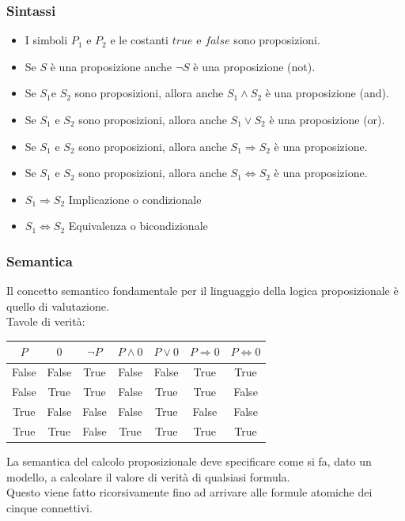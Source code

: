 \documentclass[../main.tex]{subfiles}
\begin{document}
	\subsubsection{Sintassi}
	\begin{itemize}
		\item I simboli $P_1$ e $P_2$ e le costanti $true$ e $false$ sono proposizioni.
		\item Se $S$ è una proposizione anche $\neg S$ è una proposizione (not).
		\item Se $S_1$e $S_2$ sono proposizioni, allora anche $S_1 \wedge S_2$ è una proposizione (and).
		\item Se $S_1$ e $S_2$ sono proposizioni, allora anche $S_1 \vee S_2$ è una proposizione (or).
		\item Se $S_1$ e $S_2$ sono proposizioni, allora anche $S_1 \Rightarrow S_2$ è una proposizione.
		\item Se $S_1$ e $S_2$ sono proposizioni, allora anche $S_1 \Leftrightarrow S_2$ è una proposizione.
		\item $S_1 \Rightarrow S_2$ Implicazione o condizionale
		\item $S_1 \Leftrightarrow S_2$ Equivalenza o bicondizionale
	\end{itemize}
	\subsubsection{Semantica}
	Il concetto semantico fondamentale per il linguaggio della logica proposizionale è quello di valutazione.\\
	Tavole di verità:
	\begin{center}
		\begin{tabular}{ |c|c|c|c|c|c|c| }
			\hline
			$P$ & $0$ & $\neg P$ & $P \wedge 0$ & $P \vee 0$ & $P \Rightarrow 0$ & $P \Leftrightarrow 0$\\
			\hline
			False & False & True & False & False & True & True\\
			\hline
			False & True & True & False & True & True & False\\
			\hline
			True & False & False & False & True & False & False\\
			\hline
			True & True & False & True & True & True & True \\
			\hline
		\end{tabular}
	\end{center}
	La semantica del calcolo proposizionale deve specificare come si fa, dato un modello, a calcolare il valore di verità di qualsiasi formula. \\
	Questo viene fatto ricorsivamente fino ad arrivare alle formule atomiche dei cinque connettivi.
\end{document}
